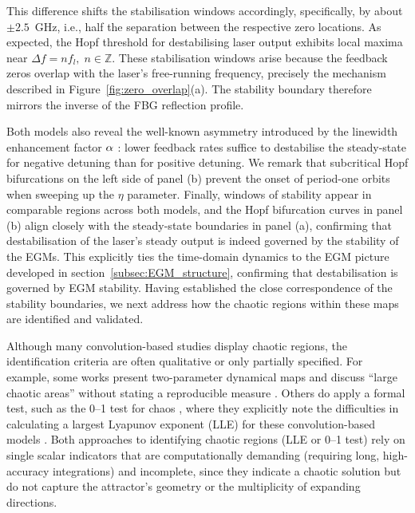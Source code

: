 This difference shifts the stabilisation windows accordingly, specifically, by about $\pm 2.5$~GHz, i.e., half the separation between the respective zero locations.
As expected, the Hopf threshold for destabilising laser output exhibits local maxima near $\Delta f = n f_l,\; n\in\mathbb{Z}$.
These stabilisation windows arise because the feedback zeros overlap with the laser's free-running frequency, precisely the mechanism described in Figure~\ref{fig:zero_overlap}(a).
The stability boundary therefore mirrors the inverse of the FBG reflection profile.
%
\par
%
Both models also reveal the well-known asymmetry introduced by the linewidth enhancement factor $\alpha$ \cite{erneux2010laser}: lower feedback rates suffice to destabilise the steady-state for negative detuning than for positive detuning.
We remark that subcritical Hopf bifurcations on the left side of panel (b) prevent the onset of period-one orbits when sweeping up the $\eta$ parameter.
Finally, windows of stability appear in comparable regions across both models, and the Hopf bifurcation curves in panel (b) align closely with the steady-state boundaries in panel (a), confirming that destabilisation of the laser’s steady output is indeed governed by the stability of the EGMs.
This explicitly ties the time-domain dynamics to the EGM picture developed in section~\ref{subsec:EGM_structure}, confirming that destabilisation is governed by EGM stability.
Having established the close correspondence of the stability boundaries, we next address how the chaotic regions within these maps are identified and validated.
%
\par
%
Although many convolution-based studies display chaotic regions, the identification criteria are often qualitative or only partially specified. 
For example, some works present two-parameter dynamical maps and discuss “large chaotic areas” without stating a reproducible measure \cite{li2015chaotic,li2020stable,li2012distributed}. 
Others do apply a formal test, such as the 0–1 test for chaos \cite{gottwald2009implementation}, where they explicitly note the difficulties in calculating a largest Lyapunov exponent (LLE) for these convolution-based models \cite{jiang2021characterizing}.
Both approaches to identifying chaotic regions (LLE or 0–1 test) rely on single scalar indicators that are computationally demanding (requiring long, high-accuracy integrations) and incomplete, since they indicate a chaotic solution but do not capture the attractor’s geometry or the multiplicity of expanding directions.
%
\par

